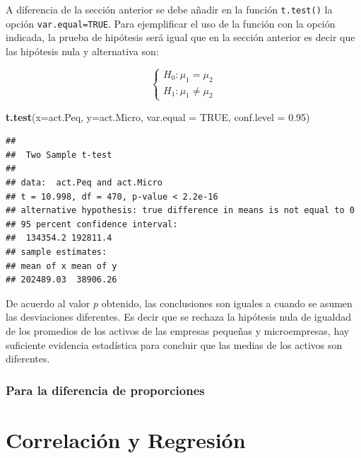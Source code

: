 \documentclass[letterpaper,]{book}
\newenvironment{Shaded}{\begin{snugshade}}{\end{snugshade}}
\newcommand{\DataTypeTok}[1]{\textcolor[rgb]{0.13,0.29,0.53}{#1}}
\newcommand{\FloatTok}[1]{\textcolor[rgb]{0.00,0.00,0.81}{#1}}
\newcommand{\KeywordTok}[1]{\textcolor[rgb]{0.13,0.29,0.53}{\textbf{#1}}}
\newcommand{\NormalTok}[1]{#1}
\newcommand{\OtherTok}[1]{\textcolor[rgb]{0.56,0.35,0.01}{#1}}
\begin{document}
A diferencia de la sección anterior se debe añadir en la función \texttt{t.test()} la opción \texttt{var.equal=TRUE}. Para ejemplificar el uso de la función con la opción indicada, la prueba de hipótesis será igual que en la sección anterior es decir que las hipótesis nula y alternativa son:

\begin{equation} 
\begin{cases} 
H_0: \mu_1 = \mu_2 \\ 
H_1: \mu_1 \neq \mu_2
\end{cases} 
\end{equation}

\begin{Shaded}
\begin{Highlighting}[]
\KeywordTok{t.test}\NormalTok{(}\DataTypeTok{x=}\NormalTok{act.Peq, }\DataTypeTok{y=}\NormalTok{act.Micro, }\DataTypeTok{var.equal =} \OtherTok{TRUE}\NormalTok{,}
       \DataTypeTok{conf.level =} \FloatTok{0.95}\NormalTok{)}
\end{Highlighting}
\end{Shaded}

\begin{verbatim}
## 
##  Two Sample t-test
## 
## data:  act.Peq and act.Micro
## t = 10.998, df = 470, p-value < 2.2e-16
## alternative hypothesis: true difference in means is not equal to 0
## 95 percent confidence interval:
##  134354.2 192811.4
## sample estimates:
## mean of x mean of y 
## 202489.03  38906.26
\end{verbatim}

De acuerdo al valor \(p\) obtenido, las conclusiones son iguales a cuando se asumen las desviaciones diferentes. Es decir que se rechaza la hipótesis nula de igualdad de los promedios de los activos de las empresas pequeñas y microempresas, hay suficiente evidencia estadística para concluir que las medias de los activos son diferentes.

\hypertarget{para-la-diferencia-de-proporciones}{%
\subsection{Para la diferencia de proporciones}\label{para-la-diferencia-de-proporciones}}

\hypertarget{methods}{%
\chapter{Correlación y Regresión}\label{methods}}
\end{document}
